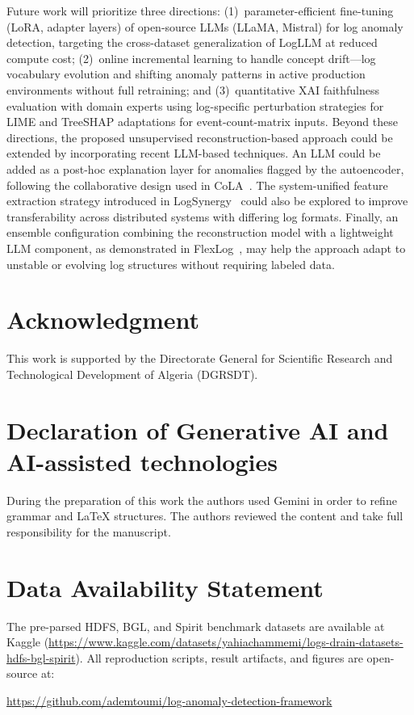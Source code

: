 \documentclass{elektr}
\begin{document}
Future work will prioritize three directions: (1)~parameter-efficient fine-tuning
(LoRA, adapter layers) of open-source LLMs (LLaMA, Mistral) for log anomaly
detection, targeting the cross-dataset generalization of LogLLM at reduced compute
cost; (2)~online incremental learning to handle concept drift---log vocabulary
evolution and shifting anomaly patterns in active production environments without
full retraining; and (3)~quantitative XAI faithfulness evaluation with domain
experts using log-specific perturbation strategies for LIME and TreeSHAP
adaptations for event-count-matrix inputs.
Beyond these directions, the proposed unsupervised reconstruction-based
approach could be extended by incorporating recent LLM-based techniques. An LLM could be added
as a post-hoc explanation layer for anomalies flagged by the autoencoder,
following the collaborative design used in CoLA~\cite{ref25}. The system-unified feature
extraction strategy introduced in LogSynergy~\cite{ref26} could also be explored to
improve transferability across distributed systems with differing log
formats. Finally, an ensemble configuration combining the reconstruction
model with a lightweight LLM component, as demonstrated in FlexLog~\cite{ref27}, may help
the approach adapt to unstable or evolving log structures without requiring
labeled data.

\section*{Acknowledgment}
This work is supported by the Directorate General for Scientific Research and Technological Development of Algeria (DGRSDT).

\section*{Declaration of Generative AI and AI-assisted technologies}
During the preparation of this work the authors used Gemini in order to refine grammar and LaTeX structures. The authors reviewed the content and take full responsibility for the manuscript.

\section*{Data Availability Statement}
The pre-parsed HDFS, BGL, and Spirit benchmark datasets are available at Kaggle
(\url{https://www.kaggle.com/datasets/yahiachammemi/logs-drain-datasets-hdfs-bgl-spirit}).
All reproduction scripts, result artifacts, and figures are open-source at:
\begin{center}
\url{https://github.com/ademtoumi/log-anomaly-detection-framework}
\end{center}
\end{document}

